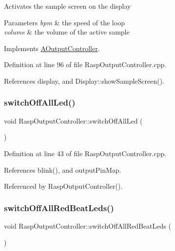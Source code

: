 Activates the sample screen on the display 
\begin{DoxyParams}{Parameters}
{\em bpm} & the speed of the loop \\
\hline
{\em volume} & the volume of the active sample \\
\hline
\end{DoxyParams}


Implements \hyperlink{class_a_output_controller_aab53d12a6aa6f38d0e4ead69e85ed4fe}{A\+Output\+Controller}.



Definition at line 96 of file Rasp\+Output\+Controller.\+cpp.



References display, and Display\+::show\+Sample\+Screen().

\mbox{\label{class_rasp_output_controller_afdd3bcfa82341a9d2539233abe7cb617}} 
\subsubsection{\texorpdfstring{switch\+Off\+All\+Led()}{switchOffAllLed()}}
{\footnotesize\ttfamily void Rasp\+Output\+Controller\+::switch\+Off\+All\+Led (\begin{DoxyParamCaption}{ }\end{DoxyParamCaption})\hspace{0.3cm}{\ttfamily [private]}}



Definition at line 43 of file Rasp\+Output\+Controller.\+cpp.



References blink(), and output\+Pin\+Map.



Referenced by Rasp\+Output\+Controller().

\mbox{\label{class_rasp_output_controller_a9a5025e13e27544721a80e6725ed23e4}} 
\subsubsection{\texorpdfstring{switch\+Off\+All\+Red\+Beat\+Leds()}{switchOffAllRedBeatLeds()}}
{\footnotesize\ttfamily void Rasp\+Output\+Controller\+::switch\+Off\+All\+Red\+Beat\+Leds (\begin{DoxyParamCaption}{ }\end{DoxyParamCaption})\hspace{0.3cm}{\ttfamily [private]}}




